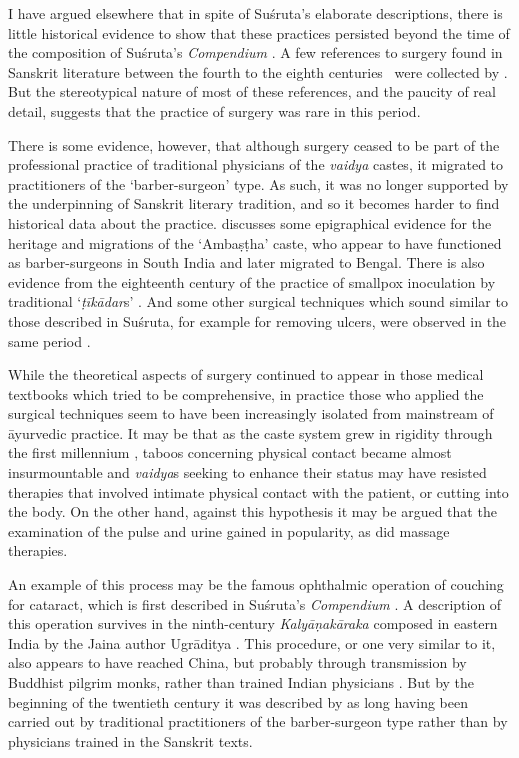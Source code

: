 
I have argued elsewhere that in spite of Suśruta's elaborate
descriptions, there is little historical evidence to show that
these practices persisted beyond the time of the composition of
Suśruta's \emph{Compendium} \citep{wuja-indi}. A few  references
to surgery found in Sanskrit literature between the fourth to the
eighth centuries \AD\ were collected by
\citet[74--8]{shar-indi}.  But the stereotypical nature of most
of these references, and the paucity of real detail, suggests
that the practice of surgery was rare in this period.

There is some evidence, however, that although surgery ceased to be part of
the professional practice of traditional physicians of the \emph{vaidya}
castes, it migrated to practitioners of the `barber-surgeon' type.  As such,
it was no longer supported by the underpinning of Sanskrit literary
tradition, and so it becomes harder to find historical data about the
practice. \citet{sirc-raks} discusses some epigraphical evidence for the
heritage and migrations of the `Ambaṣṭha' caste, who appear to have
functioned as barber-surgeons in South India and later migrated to Bengal.
There is also evidence from the eighteenth century of the practice of
smallpox inoculation by traditional `\emph{ṭīkādar}s'
\citep{holw-acco,coul-acco}. And some other surgical techniques which sound
similar to those described in Suśruta, for example for removing ulcers, were
observed in the same period
\citep[79]{babe-scie}.


While the theoretical aspects of surgery continued to appear in those
medical textbooks which tried to be comprehensive, in practice those who
applied the surgical techniques seem to have been increasingly isolated from
mainstream of āyurvedic practice. It may be that as the caste system grew in
rigidity through the first millennium \AD, taboos concerning physical
contact became almost insurmountable and \emph{vaidya}s seeking to enhance
their status may have resisted therapies that involved intimate physical
contact with the patient, or cutting into the body.  On the other hand,
against this hypothesis it may be argued that the examination of the pulse
and urine gained in popularity, as did massage therapies.

An example of this process may be the famous ophthalmic operation
of couching for cataract, which is first described in Suśruta's
\emph{Compendium} \citep[well outlined by][378--9]{majn-heal}. A
description of this operation survives in the ninth-century
\emph{Kalyāṇa\-kāraka} composed in eastern India by the Jaina
author Ugrāditya \citep[67, n.\,76]{Meulenbeld1984}. This
procedure, or one very similar to it, also appears to have reached
China, but probably through transmission by Buddhist pilgrim
monks, rather than trained Indian physicians
\citep[132--48]{unsc-medi}. But by the beginning of the twentieth
century it was described by \citet{elli-indi} as long having been
carried out by traditional practitioners of the barber-surgeon
type rather than by physicians trained in the Sanskrit texts.

